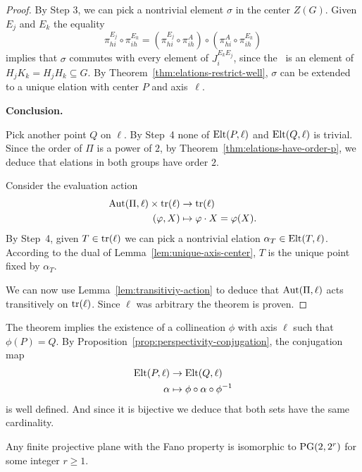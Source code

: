 \begin{proof}
    By Step 3, we can pick a nontrivial element $\sigma$ in the center $Z(G)$. Given $E_j$ and $E_k$ the equality
    \[
        \pi_{hi}^{E_j}\circ\pi_{ih}^{E_k}
            = (\pi_{hi}^{E_j}\circ\pi_{ih}^A)\circ
                (\pi_{hi}^A\circ\pi_{ih}^{E_k})
    \]
    implies that $\sigma$ commutes with every element of $J_i^{E_kE_j}$, since the \rhs\ is an element of $H_jK_k=H_jH_k\subseteq G$. By Theorem~\ref{thm:elations-restrict-well}, $\sigma$ can be extended to a unique elation with center $P$ and axis~$\ell$.
    
    \medskip

    \textbf{Conclusion.}

    Pick another point $Q$ on $\ell$. By Step~4 none of $\mathrm{Elt}(P,\ell)$ and $\mathrm{Elt}(Q,\ell)$ is trivial. Since the order of $\Pi$ is a power of $2$, by Theorem~\ref{thm:elations-have-order-p}, we deduce that elations in both groups have order $2$.
    
    Consider the evaluation action
    \begin{align*}
        \operatorname{Aut}(\Pi,\ell)\times\operatorname{tr}(\ell)&\to\operatorname{tr}(\ell)\\
        (\varphi,X) &\mapsto \varphi\cdot X=\varphi(X).
    \end{align*}
    By Step~4, given $T\in\operatorname{tr}(\ell)$ we can pick a nontrivial elation $\alpha_T\in\mathrm{Elt}(T,\ell)$. According to the dual of Lemma~\ref{lem:unique-axis-center}, $T$ is the unique point fixed by $\alpha_T$.

    We can now use Lemma~\ref{lem:transitiviy-action} to deduce that $\operatorname{Aut}(\Pi,\ell)$ acts transitively on $\operatorname{tr}(\ell)$. Since $\ell$ was arbitrary the theorem is proven.
    
\end{proof}

\begin{rem}
    The theorem implies the existence of a collineation $\phi$ with axis $\ell$ such that $\phi(P)=Q$. By Proposition~\ref{prop:perspectivity-conjugation}, the conjugation map
    \begin{align*}
        \mathrm{Elt}(P,\ell)&\to\mathrm{Elt}(Q,\ell)\\
        \alpha&\mapsto\phi\circ\alpha\circ\phi^{-1}
    \end{align*}
    is well defined. And since it is bijective we deduce that both sets have the same cardinality.
\end{rem}

\begin{cor} {\upshape[Gleason]}
    Any finite projective plane with the Fano property is isomorphic to\/ $\operatorname{PG}(2,2^r)$ for some integer\/ $r\ge 1$.
\end{cor}
